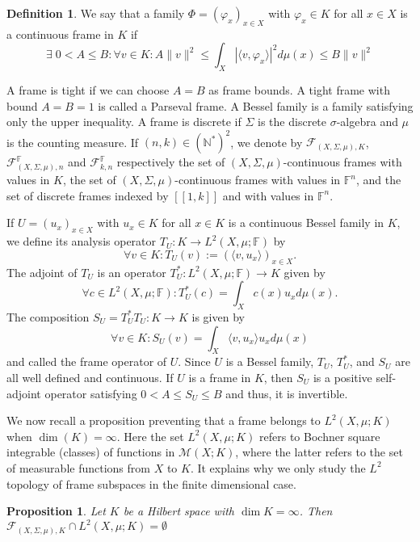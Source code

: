 \documentclass[a4paper,12pt]{article}
\theoremstyle{plain}
\newtheorem{proposition}{Proposition}[section]
\theoremstyle{definition}
\newtheorem{definition}{Definition}[section]
\theoremstyle{remark}
\begin{document}
\begin{definition} \cite{Christensen}
We say that a family $\Phi = (\varphi_x)_{x \in X}$ with $\varphi_x \in K$ for all $x \in X$ is a continuous frame in $K$ if \[ \exists \; 0 < A \leq B : \forall v \in K : A \| v \| ^2 \leq \int_X | \langle v , \varphi_x \rangle |^2 d\mu(x) \leq B \| v \|^2 \]
\end{definition}
A frame is tight if we can choose $A=B$ as frame bounds. A tight frame with bound $A=B=1$ is called a Parseval frame. A Bessel family is a family satisfying only the upper inequality. A frame is discrete if $\Sigma$ is the discrete $\sigma$-algebra and $\mu$ is the counting measure. If $(n,k) \in (\mathbb{N}^*)^2$, we denote by $\mathcal{F}_{(X,\Sigma,\mu),K}$, $\mathcal{F}_{(X,\Sigma,\mu),n}^\mathbb{F}$ and $\mathcal{F}_{k,n}^\mathbb{F}$ respectively the set of $(X,\Sigma,\mu)$-continuous frames with values in $K$, the set of $(X,\Sigma,\mu)$-continuous frames with values in $\mathbb{F}^n$, and the set of discrete frames indexed by $[\![1,k]\!]$ and with values in $\mathbb{F}^n$.

If  $U = (u_x)_{x \in X}$ with $u_x \in K$ for all $x \in K$ is a continuous Bessel family in $K$, we define its analysis operator $T_U : K \to L^2(X,\mu;\mathbb{F})$ by
\[ \forall v \in K : T_U(v) := (\langle v , u_x \rangle)_{x \in X}. \]
The adjoint of $T_U$ is an operator $T_U^* : L^2(X,\mu;\mathbb{F}) \to K$ given by
\[ \forall c \in L^2(X,\mu;\mathbb{F}) : T_U^*(c) = \int_X c(x) u_x d\mu(x). \]
The composition $S_U = T_U^* T_U : K \to K$ is given by
\[ \forall v \in K : S_U(v) = \int_X \langle v , u_x \rangle u_x d\mu(x) \]
and called the frame operator of $U$. Since $U$ is a Bessel family, $T_U$, $T_U^*$, and $S_U$ are all well defined and continuous. If $U$ is a frame in $K$, then $S_U$ is a positive self-adjoint operator satisfying $0 < A \leq S_U \leq B$ and thus, it is invertible. 

We now recall a proposition preventing that a frame belongs to $L^2(X,\mu;K)$ when $\dim(K)=\infty$. Here the set $L^2(X,\mu;K)$ refers to Bochner square integrable (classes) of functions in $\mathcal{M}(X;K)$, where the latter refers to the set of measurable functions from $X$ to $K$. It explains why we only study the $L^2$ topology of frame subspaces in the finite dimensional case.

\begin{proposition}
Let $K$ be a Hilbert space with $\dim{K} = \infty$. Then $\mathcal{F}_{(X,\Sigma,\mu),K} \cap L^2(X,\mu;K) = \emptyset$
\end{proposition}
\end{document}
